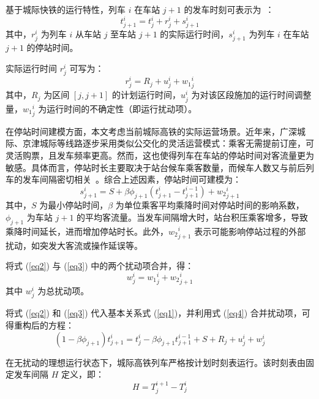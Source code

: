 基于城际快铁的运行特性，列车 $i$ 在车站 $j+1$ 的发车时刻可表示为~\cite{VanBreusegem1991}：
\begin{equation}
   t_{j+1}^{i}=t_{j}^{i}+r_{j}^{i}+s_{j+1}^{i} 
\label{eq1}
\end{equation}
其中，$r_{j}^{i}$ 为列车 $i$ 从车站 $j$ 至车站 $j+1$ 的实际运行时间，$s_{j+1}^{i}$ 为列车 $i$ 在车站 $j+1$ 的停站时间。

实际运行时间 $r_{j}^{i}$ 可写为：
\begin{equation}
   r_{j}^{i}=R_{j}+u_{j}^{i}+{w_1}_{j}^{i}
\label{eq2}
\end{equation}
其中，$R_{j}$ 为区间 $[j, j+1]$ 的计划运行时间，$u_{j}^{i}$ 为对该区段施加的运行时间调整量，${w_1}_{j}^{i}$ 为运行时间的不确定性（即运行扰动项）。

在停站时间建模方面，本文考虑当前城际高铁的实际运营场景。近年来，广深城际、京津城际等线路逐步采用类似公交化的灵活运营模式：乘客无需提前订座，可灵活购票，且发车频率更高。然而，这也使得列车在车站的停站时间对客流量更为敏感。具体而言，停站时长主要取决于站台候车乘客数量，而候车人数又与前后列车的发车间隔密切相关~\cite{Kang2024}。综合上述因素，停站时间可建模为：
\begin{equation}
    s_{j+1}^{i}=S+ \beta \phi_{j+1} (t_{j+1}^{i}-t_{j+1}^{i-1})+{w_2}_{j+1}^{i}
\label{eq3}
\end{equation}
其中，$S$ 为最小停站时间，$\beta$ 为单位乘客平均乘降时间对停站时间的影响系数，$\phi_{j+1}$ 为车站 $j+1$ 的平均客流量。当发车间隔增大时，站台积压乘客增多，导致乘降时间延长，进而增加停站时长。此外，${w_2}_{j+1}^{i}$ 表示可能影响停站过程的外部扰动，如突发大客流或操作延误等。

将式 (\ref{eq2}) 与 (\ref{eq3}) 中的两个扰动项合并，得：
\begin{equation}
    w_{j}^{i}={w_1}_{j}^{i}+{w_2}_{j+1}^{i}
\label{eq4}
\end{equation}
其中 $w_{j}^{i}$ 为总扰动项。

将式 (\ref{eq2}) 和 (\ref{eq3}) 代入基本关系式 (\ref{eq1})，并利用式 (\ref{eq4}) 合并扰动项，可得重构后的方程：
\begin{equation}
    (1-\beta \phi_{j+1})t_{j+1}^{i}=t_{j}^{i}-\beta \phi_{j+1}t_{j+1}^{i-1}+S+R_{j}+u_{j}^{i}+w_{j}^{i}
\label{eq5}
\end{equation}

在无扰动的理想运行状态下，城际高铁列车严格按计划时刻表运行。该时刻表由固定发车间隔 $H$ 定义，即：
\begin{equation}
	H=T_{j}^{i+1}- T_{j}^{i}
\label{eq6}
\end{equation}

